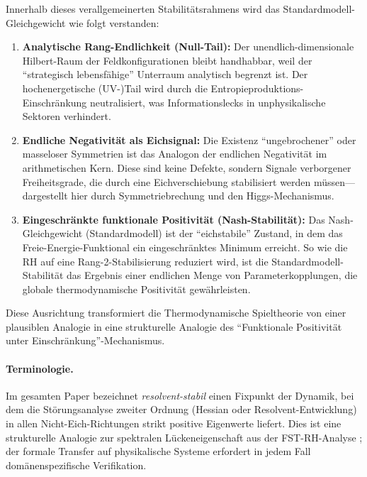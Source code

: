 \documentclass[12pt,a4paper]{article}
\theoremstyle{remark}
\begin{document}
Innerhalb dieses verallgemeinerten Stabilit\"atsrahmens wird das Standardmodell-Gleichgewicht wie folgt verstanden:
\begin{enumerate}[label=\alph*)]
    \item \textbf{Analytische Rang-Endlichkeit (Null-Tail):} Der unendlich-dimensionale Hilbert-Raum der Feldkonfigurationen bleibt handhabbar, weil der ``strategisch lebensfähige'' Unterraum analytisch begrenzt ist. Der hochenergetische (UV-)Tail wird durch die Entropieproduktions-Einschr\"ankung neutralisiert, was Informationslecks in unphysikalische Sektoren verhindert.
    \item \textbf{Endliche Negativit\"at als Eichsignal:} Die Existenz ``ungebrochener'' oder masseloser Symmetrien ist das Analogon der endlichen Negativit\"at im arithmetischen Kern. Diese sind keine Defekte, sondern Signale verborgener Freiheitsgrade, die durch eine Eichverschiebung stabilisiert werden m\"ussen---dargestellt hier durch Symmetriebrechung und den Higgs-Mechanismus.
    \item \textbf{Eingeschr\"ankte funktionale Positivit\"at (Nash-Stabilit\"at):} Das Nash-Gleichgewicht (Standardmodell) ist der ``eichstabile'' Zustand, in dem das Freie-Energie-Funktional ein eingeschr\"anktes Minimum erreicht. So wie die RH auf eine Rang-2-Stabilisierung reduziert wird, ist die Standardmodell-Stabilit\"at das Ergebnis einer endlichen Menge von Parameterkopplungen, die globale thermodynamische Positivit\"at gew\"ahrleisten.
\end{enumerate}

Diese Ausrichtung transformiert die Thermodynamische Spieltheorie von einer plausiblen Analogie in eine strukturelle Analogie des ``Funktionale Positivit\"at unter Einschr\"ankung''-Mechanismus.

\paragraph{Terminologie.} Im gesamten Paper bezeichnet \emph{resolvent-stabil} einen Fixpunkt der Dynamik, bei dem die St\"orungsanalyse zweiter Ordnung (Hessian oder Resolvent-Entwicklung) in allen Nicht-Eich-Richtungen strikt positive Eigenwerte liefert. Dies ist eine strukturelle Analogie zur spektralen L\"uckeneigenschaft aus der FST-RH-Analyse \citep{GeigerRH2026b}; der formale Transfer auf physikalische Systeme erfordert in jedem Fall dom\"anenspezifische Verifikation.

\end{document}
